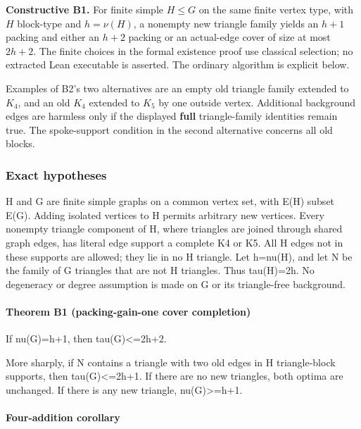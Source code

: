 \documentclass[11pt]{article}
\begin{document}
\textbf{Constructive B1.} For finite simple \(H\le G\) on the same finite vertex type, with \(H\) block-type and \(h=\nu(H)\), a nonempty new triangle family yields an \(h+1\) packing and either an \(h+2\) packing or an actual-edge cover of size at most \(2h+2\). The finite choices in the formal existence proof use classical selection; no extracted Lean executable is asserted. The ordinary algorithm is explicit below.

Examples of B2's two alternatives are an empty old triangle family extended to \(K_4\), and an old \(K_4\) extended to \(K_5\) by one outside vertex. Additional background edges are harmless only if the displayed \textbf{full} triangle-family identities remain true. The spoke-support condition in the second alternative concerns all old blocks.

\subsubsection{Exact hypotheses}\label{exact-hypotheses}

H and G are finite simple graphs on a common vertex set, with E(H) subset E(G). Adding isolated vertices to H permits arbitrary new vertices. Every nonempty triangle component of H, where triangles are joined through shared graph edges, has literal edge support a complete K4 or K5. All H edges not in these supports are allowed; they lie in no H triangle. Let h=nu(H), and let N be the family of G triangles that are not H triangles. Thus tau(H)=2h. No degeneracy or degree assumption is made on G or its triangle-free background.

\paragraph{Theorem B1 (packing-gain-one cover completion)}\label{theorem-b1-packing-gain-one-cover-completion}

If nu(G)=h+1, then tau(G)\textless=2h+2.

More sharply, if N contains a triangle with two old edges in H triangle-block supports, then tau(G)\textless=2h+1. If there are no new triangles, both optima are unchanged. If there is any new triangle, nu(G)\textgreater=h+1.

\paragraph{Four-addition corollary}\label{four-addition-corollary}
\end{document}
